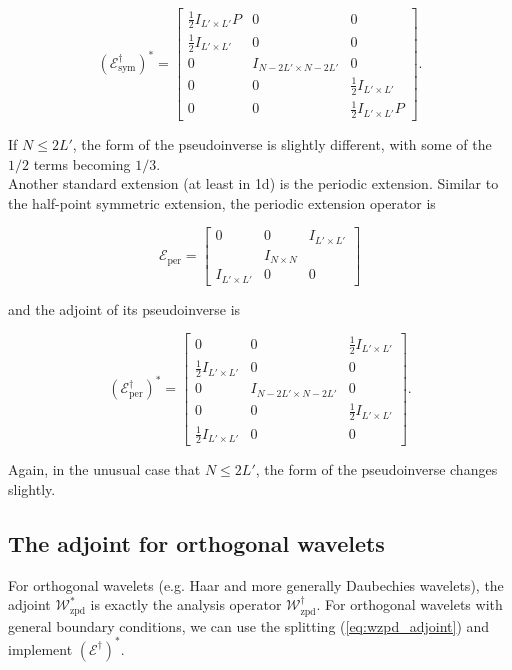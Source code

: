 \documentclass[journal]{IEEEtran}
\begin{document}
\[ \left(\mathcal{E}_\text{sym}^\dagger\right)^\ast = \begin{bmatrix}\frac{1}{2}I_{L'\times L'}P & 0 & 0\\\frac{1}{2}I_{L'\times L'} & 0 & 0\\0 & I_{N-2L'\times N-2L'} & 0\\0&0&\frac{1}{2}I_{L'\times L'}\\0&0&\frac{1}{2}I_{L'\times L'}P\end{bmatrix}. \]

\noindent If ${N \le 2L'}$, the form of the pseudoinverse is slightly different, with some of the $1/2$ terms becoming $1/3$.\\%

Another standard extension (at least in 1d) is the periodic extension.  Similar to the half-point symmetric extension, the periodic extension operator is

\[ \mathcal{E}_\text{per} = \begin{bmatrix} 0 & 0 & I_{L'\times L'}\\&I_{N\times N}&\\I_{L'\times L'}&0&0\end{bmatrix} \] 

\noindent and the adjoint of its pseudoinverse is

\[ \left(\mathcal{E}_\text{per}^\dagger\right)^\ast = \begin{bmatrix} 0 & 0 & \frac{1}{2}I_{L'\times L'}\\\frac{1}{2}I_{L'\times L'}&0&0\\0&I_{N-2L'\times N-2L'}&0\\0&0&\frac{1}{2}I_{L'\times L'}\\\frac{1}{2}I_{L'\times L'}&0&0\end{bmatrix}. \] 

\noindent Again, in the unusual case that $N\le 2L'$, the form of the pseudoinverse changes slightly.\\


\subsection{The adjoint for orthogonal wavelets}
For orthogonal wavelets (e.g. Haar and more generally Daubechies wavelets), the adjoint $\mathcal{W}_\text{zpd}^\ast$ is exactly the analysis operator $\mathcal{W}_\text{zpd}^\dagger$.  For orthogonal wavelets with general boundary conditions, we can use the splitting (\ref{eq:wzpd_adjoint}) and implement $\left(\mathcal{E}^\dagger\right)^\ast$.\\
\end{document}
